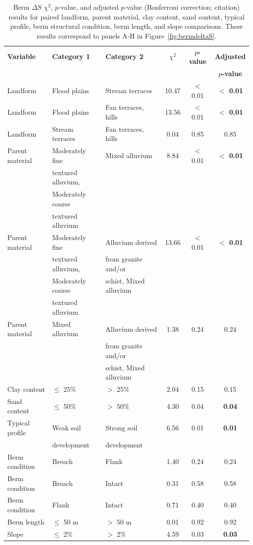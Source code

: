 \documentclass[review]{elsarticle}
\begin{document}
\begin{table}[htb!]
\centering
\caption{Berm $\Delta S$ $\chi^2$, $p$-value, and adjusted $p$-value (Bonferroni correction; citation) results for paired landform, parent material, clay content, sand content, typical profile, berm structural condition, berm length, and slope comparisons. These results correspond to panels A-H in Figure~\ref{fig:bermdeltaS}.}
\begin{tabular}{l|l|l|c|c|c}
\hline
\textbf{Variable} & \textbf{Category 1} & \textbf{Category 2} & \textbf{$\chi^2$} & \textbf{$p$-value} & \textbf{Adjusted} \\
& & & & & \textbf{$p$-value} \\ 
\hline
Landform & Flood plains & Stream terraces & 10.47 & $<$ 0.01 & \textbf{$<$ 0.01} \\
Landform & Flood plains & Fan terraces, hills & 13.56 & $<$ 0.01 & \textbf{$<$ 0.01} \\
Landform & Stream terraces & Fan terraces, hills & 0.04 & 0.85 & 0.85 \\
Parent material & Moderately fine & Mixed alluvium & 8.84 & $<$ 0.01 & \textbf{$<$ 0.01} \\  
& textured alluvium, & & & \\ 
& Moderately coarse  & & & \\
& textured alluvium  & & & \\
Parent material & Moderately fine & Alluvium derived & 13.66 & $<$ 0.01 & \textbf{$<$ 0.01} \\ 
& textured alluvium, & from granite and/or & & & \\ 
& Moderately coarse & schist, Mixed alluvium & & & \\ 
& textured alluvium & & & \\
Parent material & Mixed alluvium & Alluvium derived & 1.38 & 0.24 & 0.24 \\ 
& & from granite and/or  & & & \\ 
& & schist, Mixed alluvium & & & \\ 
Clay content & $\leq$ 25\% & $>$ 25\% & 2.04 & 0.15 & 0.15 \\
Sand content & $\leq$ 50\% & $>$ 50\% & 4.30 & 0.04 & \textbf{0.04} \\
Typical profile & Weak soil & Strong soil & 6.56 & 0.01 & \textbf{0.01} \\
& development & development & & & \\
Berm condition & Breach & Flank & 1.40 & 0.24 & 0.24 \\
Berm condition & Breach & Intact & 0.31 & 0.58 & 0.58 \\
Berm condition & Flank & Intact & 0.71 & 0.40 & 0.40 \\
Berm length & $\leq$ 50 m & $>$ 50 m & 0.01 & 0.92 & 0.92 \\
Slope & $\leq$ 2\% & $>$ 2\% & 4.59 & 0.03 & \textbf{0.03} \\
\hline
\end{tabular}
\label{tab:bermdeltaS}
\end{table}
\end{document}
